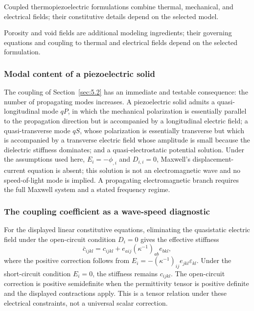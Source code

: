 Coupled thermopiezoelectric formulations combine thermal, mechanical, and electrical fields; their constitutive details depend on the selected model.

Porosity and void fields are additional modeling ingredients; their governing equations and coupling to thermal and electrical fields depend on the selected formulation.

\subsubsection{Modal content of a piezoelectric solid}

The coupling of Section~\ref{sec:5.2} has an immediate and testable consequence: the number of propagating modes increases. A piezoelectric solid admits a quasi-longitudinal mode $qP$, in which the mechanical polarization is essentially parallel to the propagation direction but is accompanied by a longitudinal electric field; a quasi-transverse mode $qS$, whose polarization is essentially transverse but which is accompanied by a transverse electric field whose amplitude is small because the dielectric stiffness dominates; and a quasi-electrostatic potential solution. Under the assumptions used here, $E_i=-\phi_{,i}$ and $D_{i,i}=0$, Maxwell's displacement-current equation is absent; this solution is not an electromagnetic wave and no speed-of-light mode is implied. A propagating electromagnetic branch requires the full Maxwell system and a stated frequency regime.

\subsubsection{The coupling coefficient as a wave-speed diagnostic}

For the displayed linear constitutive equations, eliminating the quasistatic electric field under the open-circuit condition $D_i=0$ gives the effective stiffness
\begin{equation}
\bar{c}_{ijkl} = c_{ijkl} + e_{aij}(\kappa^{-1})_{ab}e_{bkl},
\label{eq:5.19}
\end{equation}
where the positive correction follows from $E_i=-(\kappa^{-1})_{ij}e_{jkl}\varepsilon_{kl}$. Under the short-circuit condition $E_i=0$, the stiffness remains $c_{ijkl}$. The open-circuit correction is positive semidefinite when the permittivity tensor is positive definite and the displayed contractions apply. This is a tensor relation under these electrical constraints, not a universal scalar correction.


